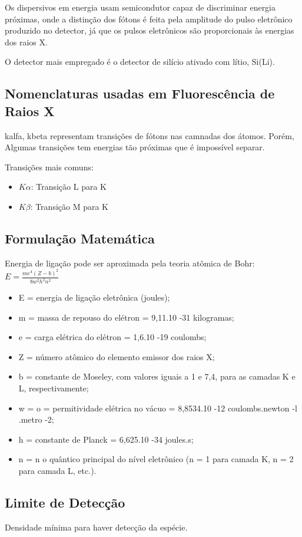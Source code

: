 Os dispersivos em energia usam semicondutor capaz de discriminar energia 
próximas, onde a distinção dos fótons é feita pela amplitude do pulso 
eletrônico produzido no detector, já que os pulsos eletrônicos são
proporcionais às energias dos raios X. 

O detector mais empregado é o detector de silício ativado com lítio, Si(Li).

\subsection{Nomenclaturas usadas em Fluorescência de Raios X}
kalfa, kbeta representam transições de fótons nas camnadas dos átomos.
Porém, Algumas transições tem energias tão próximas que é impossível separar.

Transições mais comuns:
\begin{itemize}
  \item $K\alpha$: Transição L para K
  \item $K\beta$: Transição M para K
\end{itemize}


\subsection{Formulação Matemática}

Energia de ligação pode ser aproximada pela teoria atômica de Bohr:
\begin{math}
E = \frac{me^4(Z-b)^2}{8w^2h^2n^2}
\end{math}

\begin{itemize}
  \item E = energia de ligação eletrônica (joules);
  \item m = massa de repouso do elétron = 9,11.10 -31 kilogramas;
  \item e = carga elétrica do elétron = 1,6.10 -19 coulombs;
  \item Z = número atômico do elemento emissor dos raios X;
  \item b = constante de Moseley, com valores iguais a 1 e 7,4, 
        para as camadas K e L, respectivamente;
  \item w = o = permitividade elétrica no vácuo = 8,8534.10 -12 
        coulombs.newton -l .metro -2;
  \item h = constante de Planck = 6,625.10 -34 joules.s;
  \item n = n o quântico principal do nível eletrônico 
        (n = 1 para camada K, n = 2 para camada L, etc.).
\end{itemize}

\subsection{Limite de Detecção}

Densidade mínima para haver detecção da espécie. %



